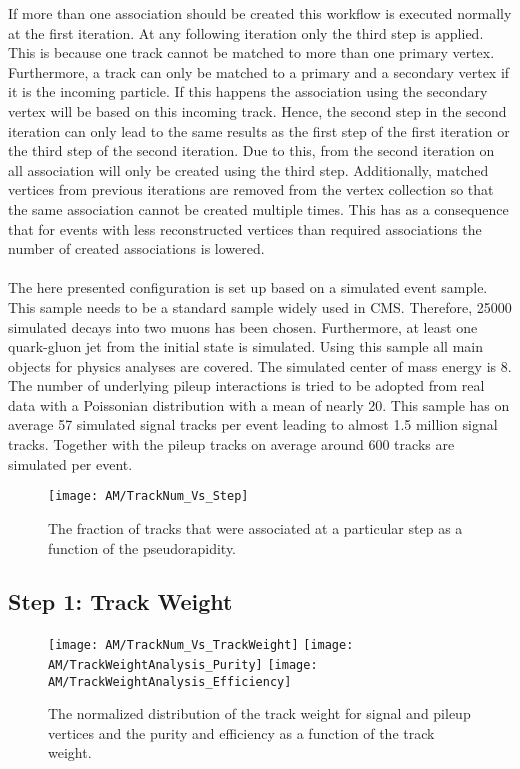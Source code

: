If more than one association should be created this workflow is executed normally at the first iteration. At any following iteration only the third step is applied. This is because one track cannot be matched to more than one primary vertex. Furthermore, a track can only be matched to a primary and a secondary vertex if it is the incoming particle. If this happens the association using the secondary vertex will be based on this incoming track. Hence, the second step in the second iteration can only lead to the same results as the first step of the first iteration or the third step of the second iteration. Due to this, from the second iteration on all association will only be created using the third step. Additionally, matched vertices from previous iterations are removed from the vertex collection so that the same association cannot be created multiple times. This has as a consequence that for events with less reconstructed vertices than required associations the number of created associations is lowered. \\ \\
The here presented configuration is set up based on a simulated event sample. This sample needs to be a standard sample widely used in CMS. Therefore, 25000 simulated \Zz decays into two muons has been chosen. Furthermore, at least one quark-gluon jet from the initial state is simulated. Using this sample all main objects for physics analyses are covered. The simulated center of mass energy is 8\TeV. The number of underlying pileup interactions is tried to be adopted from real data with a Poissonian distribution with a mean of nearly 20. This sample has on average 57 simulated signal tracks per event leading to almost 1.5 million signal tracks. Together with the pileup tracks on average around 600 tracks are simulated per event.

\begin{figure}[!ht]
  \centering
  \texttt{[image: AM/TrackNum\_Vs\_Step]}
  \caption[Plot of the fraction of tracks to be associated at which step]{The fraction of tracks that were associated at a particular step as a function of the pseudorapidity.\label{plot:AMTrackStepFrac}}
\end{figure}

\subsection{Step 1: Track Weight \label{sec:AMWFTW}}

\begin{figure}[!ht]
  \centering
  \texttt{[image: AM/TrackNum\_Vs\_TrackWeight]}
  \texttt{[image: AM/TrackWeightAnalysis\_Purity]}
  \texttt{[image: AM/TrackWeightAnalysis\_Efficiency]}
  \caption[Distribution of the track weight and purity and efficiency vs track weight]{The normalized distribution of the track weight for signal and pileup vertices and the purity and efficiency as a function of the track weight.\label{plot:AMTWdistpureff}}
\end{figure}

